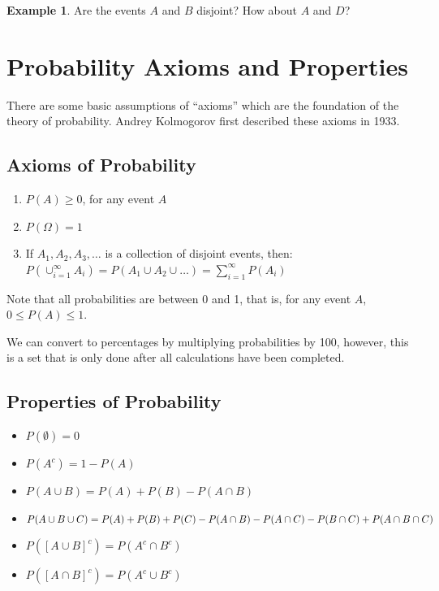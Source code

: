 \documentclass[
  11pt,
]{book}
\providecommand{\tightlist}{%
  \setlength{\itemsep}{0pt}\setlength{\parskip}{0pt}}
\theoremstyle{definition}
\theoremstyle{definition}
\newtheorem{example}{Example}[chapter]
\theoremstyle{definition}
\theoremstyle{definition}
\theoremstyle{remark}
\begin{document}
\begin{example}
Are the events \(A\) and \(B\) disjoint? How about \(A\) and \(D\)?
\end{example}

\hfill\break
\hfill\break
\hfill\break
\hfill\break
\hfill\break

\hypertarget{probability-axioms-and-properties}{%
\section{Probability Axioms and Properties}\label{probability-axioms-and-properties}}

There are some basic assumptions of ``axioms'' which are the foundation of the theory of probability. Andrey Kolmogorov first described these axioms in 1933.

\hypertarget{axioms-of-probability}{%
\subsection{Axioms of Probability}\label{axioms-of-probability}}

\begin{enumerate}
\def\labelenumi{\arabic{enumi}.}
\tightlist
\item
  \(P(A) \geq 0\), for any event \(A\)\\
\item
  \(P(\Omega) = 1\)\\
\item
  If \(A_1, A_2, A_3, \ldots\) is a collection of disjoint events, then:\\
  \(P(\cup_{i=1}^{\infty} A_i) = P(A_1 \cup A_2 \cup \ldots ) = \sum_{i=1}^{\infty} P(A_i)\)
\end{enumerate}

Note that all probabilities are between 0 and 1, that is, for any event \(A\), \(0 \leq P(A) \leq 1\).

We can convert to percentages by multiplying probabilities by 100, however, this is a set that is only done after all calculations have been completed.

\hypertarget{properties-of-probability}{%
\subsection{Properties of Probability}\label{properties-of-probability}}

\begin{itemize}
\item
  \(P(\emptyset) = 0\)\\
\item
  \(P(A^c) = 1 - P(A)\)
\item
  \(P(A \cup B) = P(A) + P(B) - P(A \cap B)\)
\item
  \(P(A \cup B \cup C) = \\ P(A) + P(B) + P(C) - P(A \cap B) - P(A \cap C) - P(B \cap C) + P(A \cap B \cap C)\)
\item
  \(P([A \cup B]^c) = P(A^c \cap B^c)\)
\item
  \(P([A \cap B]^c) = P(A^c \cup B^c)\)
\end{itemize}
\end{document}
